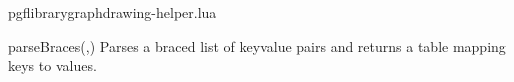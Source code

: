 
\begin{filedescription}{pgflibrarygraphdrawing-helper.lua}


\begin{luacommand}{{parseBraces}(,)}
Parses a braced list of {key}{value} pairs and returns a table mapping keys to values.



\end{luacommand}

\end{filedescription}